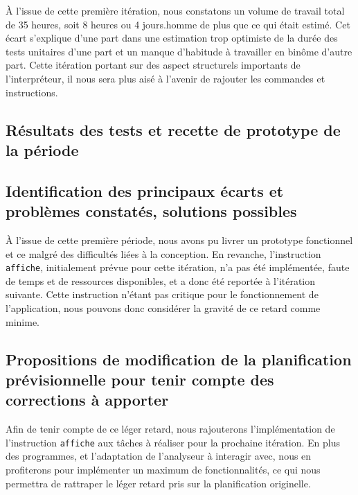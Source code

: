 \`{A} l'issue de cette première itération, nous constatons un volume de travail
total de 35 heures, soit 8 heures ou 4 jours.homme de plus que ce qui était
estimé. Cet écart s'explique d'une part dans une estimation trop optimiste de la
durée des tests unitaires d'une part et un manque d'habitude à travailler en
binôme d'autre part. Cette itération portant sur des aspect structurels importants
de l'interpréteur, il nous sera plus aisé à l'avenir de rajouter les commandes
et instructions.


\subsection{Résultats des tests et recette de prototype de la période}


\subsection{Identification des principaux écarts et problèmes constatés, solutions possibles}
\`{A} l'issue de cette première période, nous avons pu livrer un prototype
fonctionnel et ce malgré des difficultés liées à la conception. En revanche,
l'instruction \verb|affiche|, initialement prévue pour cette itération, n'a
pas été implémentée, faute de temps et de ressources disponibles, et a donc été
reportée à l'itération suivante. Cette instruction n'étant pas critique pour
le fonctionnement de l'application, nous pouvons donc considérer la gravité
de ce retard comme minime.

\subsection{Propositions de modification de la planification prévisionnelle pour tenir compte des corrections à apporter}
Afin de tenir compte de ce léger retard, nous rajouterons l'implémentation de
l'instruction \verb|affiche| aux tâches à réaliser pour la prochaine itération.
En plus des programmes, et l'adaptation de l'analyseur à interagir avec, nous en
profiterons pour implémenter un maximum de fonctionnalités, ce qui nous permettra
de rattraper le léger retard pris sur la planification originelle.

